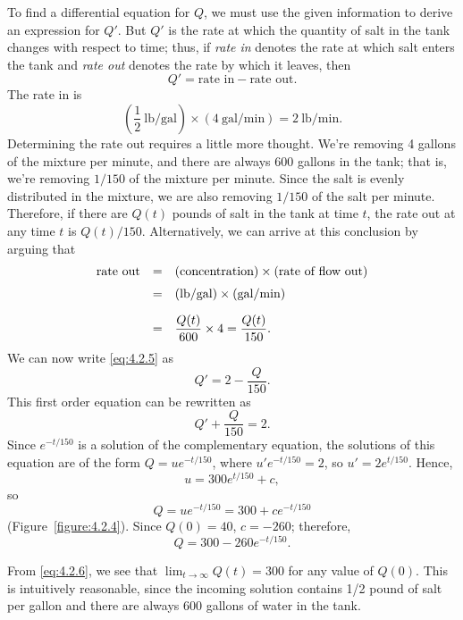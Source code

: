 \begin{examplesolution}
 To find a differential equation for $Q$, we must use the given information to
derive an expression for $Q'$. But $Q'$ is the rate at which the quantity of salt in the tank
changes with respect to time; thus, if {\color{blue}\it rate in\/} denotes the rate at which salt
enters the tank and {\color{blue}\it rate out\/} denotes the rate by which it leaves, then
\begin{equation}
  \label{eq:4.2.5}Q'=\mbox{rate in}-\mbox{rate out}.
\end{equation}
The rate in is
\[
  \left(\frac{1}{2}\ \mbox{lb/gal}\right)\times(4\ \mbox{gal/min})=2\
\mbox{lb/min}.
\]
Determining the rate out requires a little more thought. We're removing 4 gallons of the mixture per
minute, and there are always 600 gallons in the tank; that is, we're removing $1/150$ of the mixture
per minute. Since the salt is evenly distributed in the mixture, we are also removing $1/150$ of the
salt per minute. Therefore, if there are $Q(t)$ pounds of salt in the tank at time $t$, the rate out
at any time $t$ is $Q(t)/150$. Alternatively, we can arrive at this conclusion by arguing that
\[
  \begin{array}{lcl}
    \mbox{rate out} & = & (\mbox{concentration})\times(\mbox{rate of flow out}) \\[6pt]
    \mbox{}         & = & (\mbox{lb/gal})\times(\mbox{gal/min})                 \\[10pt]
                    & = & \displaystyle\frac{Q(t)}{600}\times 4=\displaystyle\frac{Q(t)}{150}.
  \end{array}
\]
We can now write \eqref{eq:4.2.5} as
\[
  Q'=2-\frac{Q}{150}.
\]
This first order equation can be rewritten as
\[
  Q'+\frac{Q}{150}=2.
\]
Since $e^{-t/150}$ is a solution of the complementary equation, the solutions of this equation are
of the form $Q=ue^{-t/150}$, where $u'e^{-t/150}=2$, so $u'=2e^{t/150}$. Hence,
\[
  u=300e^{t/150}+c,
\]
so
\begin{equation}
  \label{eq:4.2.6}Q=ue^{-t/150}=300+ce^{-t/150}
\end{equation}
(Figure~\ref{figure:4.2.4}). Since $Q(0)=40$, $c=-260$; therefore,
\[
  Q=300-260e^{-t/150}.
\]

 From \eqref{eq:4.2.6}, we see that $\lim_{t\to \infty}Q(t)=300$ for any value
of $Q(0)$. This is intuitively reasonable, since the incoming solution contains 1/2 pound of salt
per gallon and there are always 600 gallons of water in the tank. \quad
\end{examplesolution}


